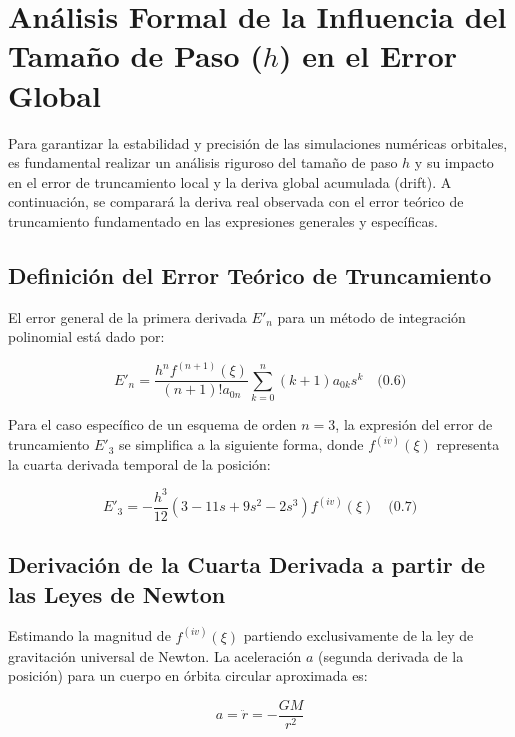 \documentclass[11pt, a4paper]{article}
\begin{document}
	
	\section{Análisis Formal de la Influencia del Tamaño de Paso ($h$) en el Error Global}
	
	Para garantizar la estabilidad y precisión de las simulaciones numéricas orbitales, es fundamental realizar un análisis riguroso del tamaño de paso $h$ y su impacto en el error de truncamiento local y la deriva global acumulada (drift). A continuación, se comparará la deriva real observada con el error teórico de truncamiento fundamentado en las expresiones generales y específicas.
	
	\subsection{Definición del Error Teórico de Truncamiento}
	
	El error general de la primera derivada $E'_n$ para un método de integración polinomial está dado por:
	
	$$ E'_n = \frac{h^n f^{(n+1)}(\xi)}{(n+1)! a_{0n}} \sum_{k=0}^n (k+1)a_{0k}s^k \quad \text{(0.6)} $$
	
	Para el caso específico de un esquema de orden $n=3$, la expresión del error de truncamiento $E'_3$ se simplifica a la siguiente forma, donde $f^{(iv)}(\xi)$ representa la cuarta derivada temporal de la posición:
	
	$$ E'_3 = -\frac{h^3}{12} (3 - 11s + 9s^2 - 2s^3) f^{(iv)}(\xi) \quad \text{(0.7)} $$
	
	\subsection{Derivación de la Cuarta Derivada a partir de las Leyes de Newton}
	
	Estimando la magnitud de $f^{(iv)}(\xi)$ partiendo exclusivamente de la ley de gravitación universal de Newton. La aceleración $a$ (segunda derivada de la posición) para un cuerpo en órbita circular aproximada es:
	
	$$ a = \ddot{r} = -\frac{GM}{r^2} $$
	
\end{document}
